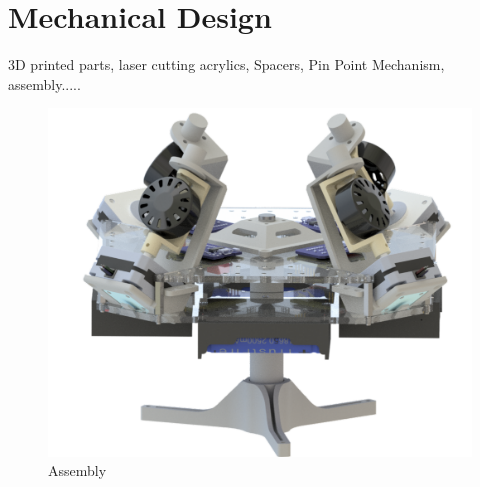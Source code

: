 \chapter{Mechanical Design}
\label{chap:7}

3D printed parts, laser cutting acrylics, Spacers, Pin Point Mechanism, assembly.....

\begin{figure}
    \centering
    \includegraphics[width=\textwidth]{figures/Assembly/AssemblyACR - Transperent.pdf}
    \caption{Assembly}
    \label{fig:my_AssemblyACR}
\end{figure}
